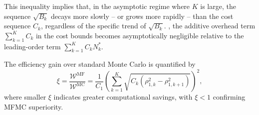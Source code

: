This inequality implies that, in the asymptotic regime where $K$ is large,  the sequence $\sqrt{B_k}$ decays more slowly -- or grows more rapidly -- than the cost sequence $C_k$, regardless of the specific trend of $\sqrt{B_k}$. , the additive overhead term $\sum_{k=1}^K C_k$ in the cost bounds becomes asymptotically negligible relative to the leading-order term $\sum_{k=1}^K C_kN_k^*$. 


The efficiency gain over standard Monte Carlo is quantified by
%
\begin{equation}\label{eq:MFMC_sampling_cost_efficiency}
    \xi = \frac{\mathcal{W}^\text{MF}}{\mathcal{W}^\text{MC}} = \frac{1}{C_1} \left(\sum_{k=1}^K\sqrt{C_k\left(\rho_{1,k}^2 - \rho_{1,k+1}^2\right)}\right)^2,
\end{equation}
%
where smaller $\xi$ indicates greater computational savings, with $\xi < 1$ confirming MFMC superiority.


